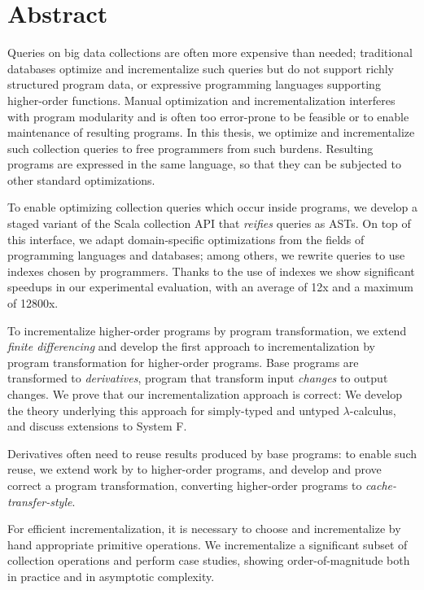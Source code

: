 \chapter{Abstract}

Queries on big data collections are often more expensive than needed;
traditional databases optimize and incrementalize such queries but do not
support richly structured program data, or expressive programming languages
supporting higher-order functions. Manual optimization and incrementalization
interferes with program modularity and is often too error-prone to be feasible
or to enable maintenance of resulting programs.
In this thesis, we optimize and incrementalize such collection queries to free
programmers from such burdens.
Resulting programs are expressed in the same language, so that they can be
subjected to other standard optimizations.

To enable optimizing collection queries which occur inside programs, we develop a
staged variant of the Scala collection API that \emph{reifies} queries as ASTs.
On top of this interface, we adapt domain-specific optimizations from the fields
of programming languages and databases; among others, we rewrite queries to use
indexes chosen by programmers. Thanks to the use of indexes we show significant
speedups in our experimental evaluation, with an average of 12x and a maximum of
12800x.

To incrementalize higher-order programs by program transformation, we extend
\emph{finite differencing} \citep{Paige82FDC,Blakeley:1986:EUM,Gupta99MMV} and
develop the first approach to incrementalization by program transformation for
higher-order programs. Base programs are transformed to \emph{derivatives},
program that transform input \emph{changes} to output changes.
We prove that our incrementalization approach is correct: We develop the theory
underlying this approach for simply-typed and untyped $\lambda$-calculus, and
discuss extensions to System F.

Derivatives often need to reuse results produced by base programs: to enable
such reuse, we extend work by \citet{Liu95} to higher-order programs, and
develop and prove correct a program transformation, converting higher-order
programs to \emph{cache-transfer-style}.

For efficient incrementalization, it is necessary to choose and incrementalize
by hand appropriate primitive operations. We incrementalize a significant subset
of collection operations and perform case studies, showing order-of-magnitude
both in practice and in asymptotic complexity.

